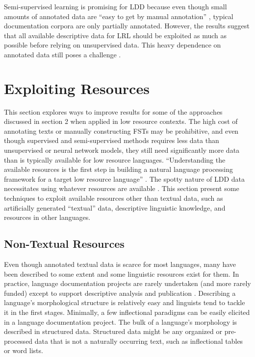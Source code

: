 \documentclass[12pt]{article}
\begin{document}
Semi-supervised learning is promising for LDD because even though small amounts of annotated data are ``easy to get by manual annotation'' \cite[page 49]{virpioja_empirical_2011}, typical documentation corpora are only partially annotated. However, the results suggest that all available descriptive data for LRL should be exploited as much as possible before relying on unsupervised data. This heavy dependence on annotated data still poses a challenge \cite{andrews_bayesian_2017}. 

\section{Exploiting Resources}
\label{resources}

This section explores ways to improve results for some of the approaches discussed in section 2 when applied in low resource contexts. The high cost of annotating texts or manually constructing FSTs may be prohibitive,  and even though supervised and semi-supervised methods requires less data than unsupervised or neural network models, they still need significantly more data than is typically available for low resource languages. ``Understanding the available resources is the first step in building a natural language processing framework for a target low resource language'' \cite[page 13]{duong_natural_2017}. The spotty nature of LDD data necessitates using whatever resources are available \cite{palmer_semi-automated_2009}. This section present some techniques to exploit available resources other than textual data, such as artificially generated ``textual'' data, descriptive linguistic knowledge, and resources in other languages. 

\subsection{Non-Textual Resources}

Even though annotated textual data is scarce for most languages, many have been described to some extent and some linguistic resources exist for them. In practice, language documentation projects are rarely undertaken (and more rarely funded) except to support descriptive analysis and publication \cite{thieberger_using_2012,austin_language_2014,vallejos_integrating_2014,thieberger_assessing_2016}. Describing a language's morphological structure is relatively easy \cite{roark_computational_2007} and linguists tend to tackle it in the first stages. Minimally, a few inflectional paradigms can be easily elicited in a language documentation project. The bulk of a language’s morphology is described in structured data. Structured data might be any organized or pre-processed data that is not a naturally occurring text, such as inflectional tables or word lists.
\end{document}
